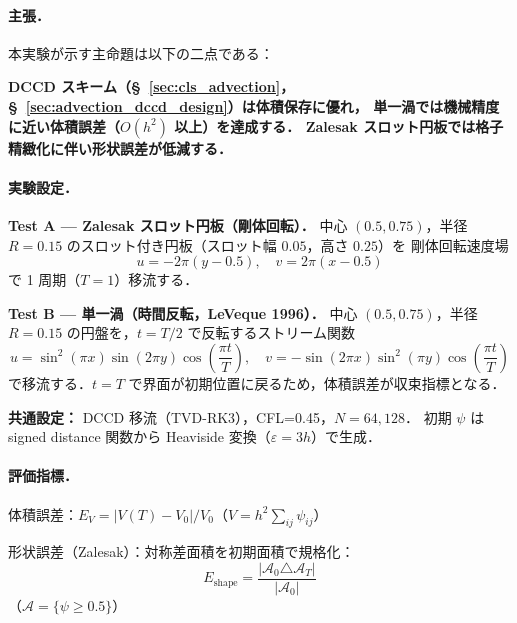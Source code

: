 %

\paragraph{主張．}

本実験が示す主命題は以下の二点である：

\begin{center}
\textbf{%
  DCCD スキーム（§~\ref{sec:cls_advection}，§~\ref{sec:advection_dccd_design}）は体積保存に優れ，%
  単一渦では機械精度に近い体積誤差（$O(h^2)$ 以上）を達成する．%
  Zalesak スロット円板では格子精緻化に伴い形状誤差が低減する．}
\end{center}

\paragraph{実験設定．}

\textbf{Test A — Zalesak スロット円板（剛体回転）．}
中心 $(0.5,0.75)$，半径 $R=0.15$ のスロット付き円板（スロット幅 $0.05$，高さ $0.25$）を
剛体回転速度場
\begin{equation}
  u = -2\pi(y - 0.5), \quad v = 2\pi(x - 0.5)
  \label{eq:solid_body_vel}
\end{equation}
で 1 周期（$T=1$）移流する．

\textbf{Test B — 単一渦（時間反転，LeVeque 1996）．}
中心 $(0.5,0.75)$，半径 $R=0.15$ の円盤を，$t = T/2$ で反転するストリーム関数
\begin{equation}
  u = \sin^2(\pi x)\sin(2\pi y)\cos\!\left(\frac{\pi t}{T}\right), \quad
  v = -\sin(2\pi x)\sin^2(\pi y)\cos\!\left(\frac{\pi t}{T}\right)
  \label{eq:single_vortex_vel}
\end{equation}
で移流する．$t=T$ で界面が初期位置に戻るため，体積誤差が収束指標となる．

\textbf{共通設定：} DCCD 移流（TVD-RK3），CFL=0.45，$N=64,128$．
初期 $\psi$ は signed distance 関数から Heaviside 変換（$\varepsilon = 3h$）で生成．

\paragraph{評価指標．}

体積誤差：$E_V = |V(T) - V_0| / V_0$（$V = h^2 \sum_{ij} \psi_{ij}$）

形状誤差（Zalesak）：対称差面積を初期面積で規格化：
\begin{equation}
  E_\text{shape} = \frac{|\mathcal{A}_0 \triangle \mathcal{A}_T|}{|\mathcal{A}_0|}
  \label{eq:shape_err}
\end{equation}
（$\mathcal{A} = \{\psi \geq 0.5\}$）

